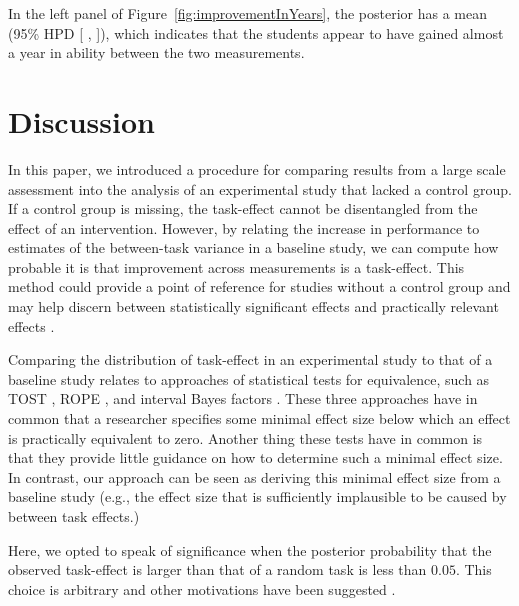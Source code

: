 \documentclass[a4paper]{article}
\newcommand{\getVal}[3]{%
	\pgfplotstablegetelem{#1}{#2}\of{#3}%
	\pgfmathprintnumber{\pgfplotsretval}%
}
\newcommand{\getCI}[2]{95\% HPD [\getVal{#1}{Lower}{#2}, \getVal{#1}{Upper}{#2}]}
\newcommand{\DONa}	[1]		{}
\begin{document}
In the left panel of Figure~\ref{fig:improvementInYears}, the posterior has a mean \getVal{0}{mean}{\tbCRIimprovement} (\getCI{0}{\tbCRIimprovement}), which indicates that the students appear to have gained almost a year in ability between the two measurements.  

\section*{Discussion}
In this paper, we introduced a procedure for comparing results from a large scale assessment into the analysis of an experimental study that lacked a control group.
If a control group is missing, the task-effect cannot be disentangled from the effect of an intervention.
However, by relating the increase in performance to estimates of the between-task variance in a baseline study, we can compute how probable it is that improvement across measurements is a task-effect.
This method could provide a point of reference for studies without a control group and may help discern between statistically significant effects and practically relevant effects
\cite{hojat2004visitor, fan2001statistical}.

Comparing the distribution of task-effect in an experimental study to that of a baseline study relates to approaches of statistical tests for equivalence, such as TOST \cite{lakens2017equivalence}, ROPE \cite{kruschke2011bayesian}, and interval Bayes factors \cite{MoreyRouder2011}.
These three approaches have in common that a researcher specifies some minimal effect size below which an effect is practically equivalent to zero.
Another thing these tests have in common is that they provide little guidance on how to determine such a minimal effect size.
In contrast, our approach can be seen as deriving this minimal effect size from a baseline study (e.g., the effect size that is sufficiently implausible to be caused by between task effects.)

Here, we opted to speak of significance when the posterior probability that the observed task-effect is larger than that of a random task is less than $0.05$. This choice is arbitrary and other motivations have been suggested \cite{McShane2017abandon, BenjaminEtAl2018}.
\end{document}
